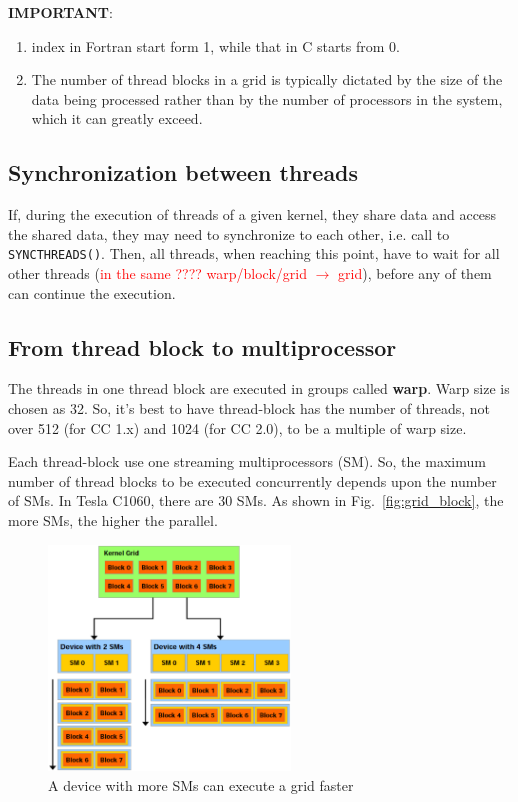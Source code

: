 {\bf IMPORTANT}:
\begin{enumerate}
\item index in Fortran start form 1, while that in C starts from 0.
\item The number of thread blocks in a grid is typically dictated by
  the size of the data being processed rather than by the number of
  processors in the system, which it can greatly exceed.
\end{enumerate}

\subsection{Synchronization between threads}
\label{sec:synchr-betw-thre}

If, during the execution of threads of a given kernel, they share data
and access the shared data, they may need to synchronize to each
other, i.e.  call to \verb!SYNCTHREADS()!. Then, all threads, when
reaching this point, have to wait for all other threads
(\textcolor{red}{in the same ???? warp/block/grid $\rightarrow$
  grid}), before any of them can continue the execution.


\subsection{From thread block to multiprocessor}
\label{sec:from-thread-block}

The threads in one thread block are executed in groups called {\bf
  warp}. Warp size is chosen as 32. So, it's best to have thread-block
has the number of threads, not over 512 (for CC 1.x) and 1024 (for CC
2.0), to be a multiple of warp size. 

Each thread-block use one streaming multiprocessors (SM). So, the
maximum number of thread blocks to be executed concurrently depends
upon the number of SMs. In Tesla C1060, there are 30 SMs. As shown in
Fig.~\ref{fig:grid_block}, the more SMs, the higher the parallel.

\begin{figure}[hbt]
  \centerline{\includegraphics[height=6cm,
    angle=0]{./images/grid_sm.eps}}
\caption{A device with more SMs can execute a grid faster}
\label{fig:grid_sm}
\end{figure}


